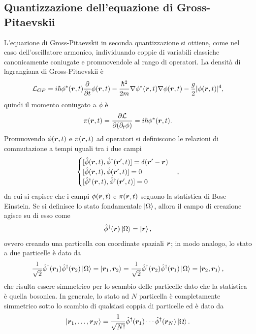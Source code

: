 \subsection{Quantizzazione dell'equazione di Gross-Pitaevskii}
L'equazione di Gross-Pitaevskii in seconda quantizzazione si ottiene, come nel caso dell'oscillatore armonico, individuando coppie di variabili classiche canonicamente coniugate e promuovendole al rango di operatori. La densità di lagrangiana di Gross-Pitaevskii è
\begin{equation}
    \mathcal{L}_{GP} = i\hbar\phi^*(\bm{r},t)\frac{\partial}{\partial t}\phi(\bm{r},t) - \frac{\hbar^2}{2m}\nabla\phi^*(\bm{r},t)\nabla\phi(\bm{r},t) - \frac{g}{2}|\phi(\bm{r},t)|^4,
\end{equation}
quindi il momento coniugato a $\phi$ è 
\begin{equation}
    \pi(\bm{r},t) = \frac{\partial \mathcal{L}}{\partial(\partial_t\phi)} = i\hbar\phi^*(\bm{r},t).
\end{equation}
Promuovendo $\phi(\bm{r},t)$ e $\pi(\bm{r},t)$ ad operatori si definiscono le relazioni di commutazione a tempi uguali tra i due campi
\begin{equation}
\label{eq: relazioni di commutazione per campi bosonici}
    \begin{cases}
        \comm{\hatphi(\vr,t)}{\hatphid(\vr',t)} = \delta(\vr' - \vr) \\
        \comm{\hatphi(\vr,t)}{\hatphi(\vr',t)} = 0 \\ 
        \comm{\hatphid(\vr,t)}{\hatphid(\vr',t)} = 0
    \end{cases},
\end{equation}
da cui si capisce che i campi $\phi(\bm{r},t)$ e $\pi(\bm{r},t)$ seguono la statistica di Bose-Einstein. Se si definisce lo stato fondamentale $\ket{\Omega}$, allora il campo di creazione agisce su di esso come
\begin{equation}
    \hat{\phi}^\dagger(\bm{r})\ket{\Omega} = \ket{\bm{r}},
\end{equation}
ovvero creando una particella con coordinate spaziali $\bm{r}$; in modo analogo, lo stato a due particelle è dato da
\begin{equation}
    \frac{1}{\sqrt{2}}\hat{\phi}^\dagger(\bm{r}_1)\hat{\phi}^\dagger(\bm{r}_2)\ket{\Omega} = \ket{\bm{r}_1,\bm{r}_2} = \frac{1}{\sqrt{2}}\hat{\phi}^\dagger(\bm{r}_2)\hat{\phi}^\dagger(\bm{r}_1)\ket{\Omega} = \ket{\bm{r}_2,\bm{r}_1},
\end{equation}
che risulta essere simmetrico per lo scambio delle particelle dato che la statistica è quella bosonica. In generale, lo stato ad $N$ particella è completamente simmetrico sotto lo scambio di qualsiasi coppia di particelle ed è dato da
\begin{equation}
    \ket{\bm{r}_1,\dots,\bm{r}_N} = \frac{1}{\sqrt{N!}}\hat{\phi}^\dagger(\bm{r}_1)\cdots\hat{\phi}^\dagger(\bm{r}_N)\ket{\Omega}.
\end{equation}
